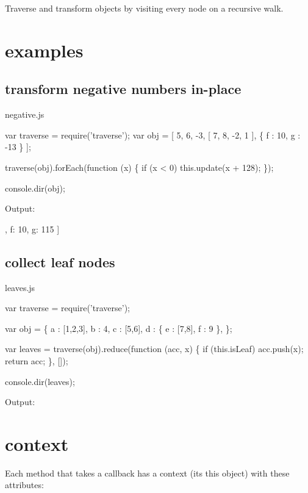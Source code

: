 Traverse and transform objects by visiting every node on a recursive walk.

\section*{examples }

\subsection*{transform negative numbers in-\/place }

negative.\+js


\begin{DoxyCode}
var traverse = require('traverse');
var obj = [ 5, 6, -3, [ 7, 8, -2, 1 ], \{ f : 10, g : -13 \} ];

traverse(obj).forEach(function (x) \{
    if (x < 0) this.update(x + 128);
\});

console.dir(obj);
\end{DoxyCode}


Output\+: \begin{DoxyVerb}[ 5, 6, 125, [ 7, 8, 126, 1 ], { f: 10, g: 115 } ]
\end{DoxyVerb}


\subsection*{collect leaf nodes }

leaves.\+js


\begin{DoxyCode}
var traverse = require('traverse');

var obj = \{
    a : [1,2,3],
    b : 4,
    c : [5,6],
    d : \{ e : [7,8], f : 9 \},
\};

var leaves = traverse(obj).reduce(function (acc, x) \{
    if (this.isLeaf) acc.push(x);
    return acc;
\}, []);

console.dir(leaves);
\end{DoxyCode}


Output\+: \begin{DoxyVerb}[ 1, 2, 3, 4, 5, 6, 7, 8, 9 ]
\end{DoxyVerb}


\section*{context }

Each method that takes a callback has a context (its {\ttfamily this} object) with these attributes\+:


